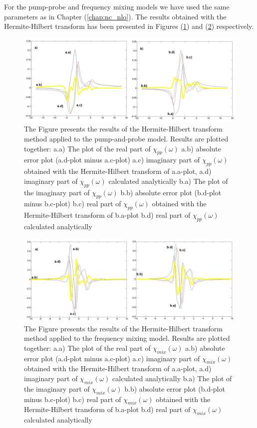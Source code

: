 \documentclass[12pt,twoside,a4paper]{article}
\numberwithin{equation}{subsection}
\numberwithin{figure}{subsection}
\begin{document}
For the pump-probe and frequency mixing models we have used the same parameters as in Chapter (\ref{chap:nc_nlo}). The results obtained with the Hermite-Hilbert transform has been presented in Figures (\ref{fig:hht_pnp}) and (\ref{fig:hht_fmix}) respectively.

\begin{figure} 
  \includegraphics[width=150mm]{img/hht_pnp.png}
  \caption{ The Figure presents the results of the Hermite-Hilbert transform method applied to the pump-and-probe model. Results are plotted together: 
     a.a) The plot of the real part of ${\chi_{pp}}(\omega )$
     a.b) absolute error plot (a.d-plot minus a.c-plot)
     a.c) imaginary part of ${\chi_{pp}}(\omega )$ obtained with the Hermite-Hilbert transform of a.a-plot, 
     a.d) imaginary part of ${\chi_{pp}}(\omega )$ calculated analytically 
     b.a) The plot of the imaginary part of ${\chi_{pp}}(\omega )$ 
     b.b) absolute error plot (b.d-plot minus b.c-plot)
     b.c) real part of ${\chi_{pp}}(\omega )$ obtained with the Hermite-Hilbert transform of b.a-plot 
     b.d) real part of $\chi_{pp} (\omega )$ calculated analytically 
     \label{fig:hht_pnp}
     }
\end{figure} 

\begin{figure} 
  \includegraphics[width=150mm]{img/hht_fmix.png}
  \caption{The Figure presents the results of the Hermite-Hilbert transform method applied to the frequency mixing model. Results are plotted together:
     a.a) The plot of the real part of ${\chi_{mix}}(\omega )$
     a.b) absolute error plot (a.d-plot minus a.c-plot)
     a.c) imaginary part of ${\chi_{mix}}(\omega )$ obtained with the Hermite-Hilbert transform of a.a-plot, 
     a.d) imaginary part of ${\chi_{mix}}(\omega )$ calculated analytically 
     b.a) The plot of the imaginary part of ${\chi_{mix}}(\omega )$ 
     b.b) absolute error plot (b.d-plot minus b.c-plot)
     b.c) real part of ${\chi_{mix}}(\omega )$ obtained with the Hermite-Hilbert transform of b.a-plot  
     b.d) real part of $\chi_{mix} (\omega )$ calculated analytically 
     \label{fig:hht_fmix}
     }
\end{figure}
\end{document}
